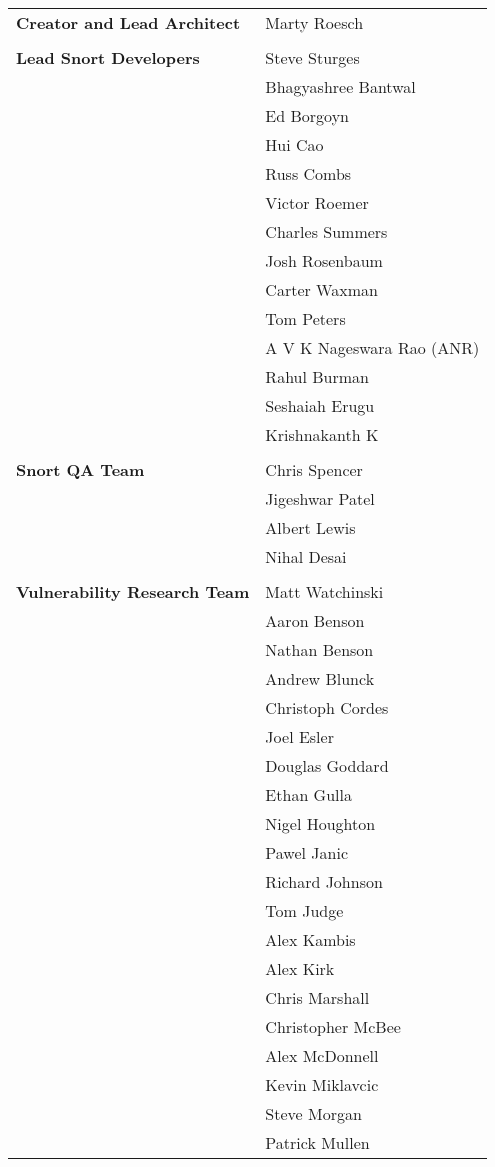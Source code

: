 \documentclass[english]{report}
\begin{document}
\begin{tabular}{p{3in} p{3in}}

\textbf{Creator and Lead Architect}
& Marty Roesch\\
\\
\textbf{Lead Snort Developers}
& Steve Sturges\\
& Bhagyashree Bantwal\\
& Ed Borgoyn\\
& Hui Cao\\
& Russ Combs\\
& Victor Roemer\\
& Charles Summers\\
& Josh Rosenbaum\\
& Carter Waxman\\
& Tom Peters\\
& A V K Nageswara Rao (ANR)\\
& Rahul Burman\\
& Seshaiah Erugu\\
& Krishnakanth K\\
\\
\textbf{Snort QA Team}
& Chris Spencer\\
& Jigeshwar Patel\\
& Albert Lewis\\
& Nihal Desai\\
\\
\textbf{Vulnerability Research Team}
& Matt Watchinski\\
& Aaron Benson\\
& Nathan Benson\\
& Andrew Blunck\\
& Christoph Cordes\\
& Joel Esler\\
& Douglas Goddard\\
& Ethan Gulla\\
& Nigel Houghton\\
& Pawel Janic\\
& Richard Johnson\\
& Tom Judge\\
& Alex Kambis\\
& Alex Kirk\\
& Chris Marshall\\
& Christopher McBee\\
& Alex McDonnell\\
& Kevin Miklavcic\\
& Steve Morgan\\
& Patrick Mullen\\

\end{tabular}
\end{document}
